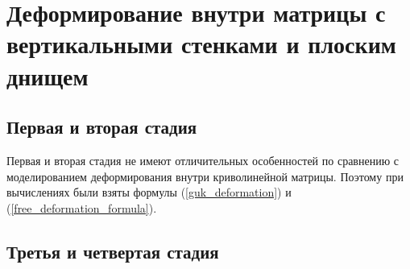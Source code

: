 \section{Деформирование внутри матрицы с вертикальными стенками и плоским днищем}
	\subsection{Первая и вторая стадия}
		Первая и вторая стадия не имеют отличительных особенностей по сравнению 
		с моделированием деформирования внутри криволинейной матрицы. Поэтому 
		при вычислениях были взяты формулы (\ref{guk_deformation}) и (\ref{free_deformation_formula}).
	\subsection{Третья и четвертая стадия}
	
